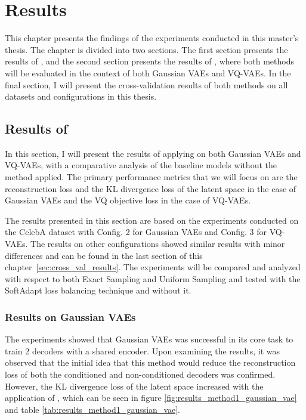 \chapter{Results}

This chapter presents the findings of the experiments conducted in this master's thesis. The chapter is divided into two sections.
The first section presents the results of , and the second section presents the results of , where both methods will be evaluated in the context of both Gaussian VAEs and VQ-VAEs. In the final section, I will present the cross-validation results of both methods on all datasets and configurations in this thesis.

\section{Results of }

In this section, I will present the results of applying  on both Gaussian VAEs and VQ-VAEs, with a comparative analysis of the baseline models without the method applied. The primary performance metrics that we will focus on are the reconstruction loss and the KL divergence loss of the latent space in the case of Gaussian VAEs and the VQ objective loss in the case of VQ-VAEs. 

The results presented in this section are based on the experiments conducted on the CelebA dataset with Config. 2 for Gaussian VAEs and Config. 3 for VQ-VAEs. The results on other configurations showed similar results with minor differences and can be found in the last section of this chapter~\ref{sec:cross_val_results}. The experiments will be compared and analyzed with respect to both Exact Sampling and Uniform Sampling and tested with the SoftAdapt loss balancing technique and without it. 

\subsection{Results on Gaussian VAEs}

The experiments showed that Gaussian VAEs  was successful in its core task to train 2 decoders with a shared encoder. Upon examining the results, it was observed that the initial idea that this method would reduce the reconstruction loss of both the conditioned and non-conditioned decoders was confirmed. However, the KL divergence loss of the latent space increased with the application of , which can be seen in figure \ref{fig:results_method1_gaussian_vae} and table \ref{tab:results_method1_gaussian_vae}.

